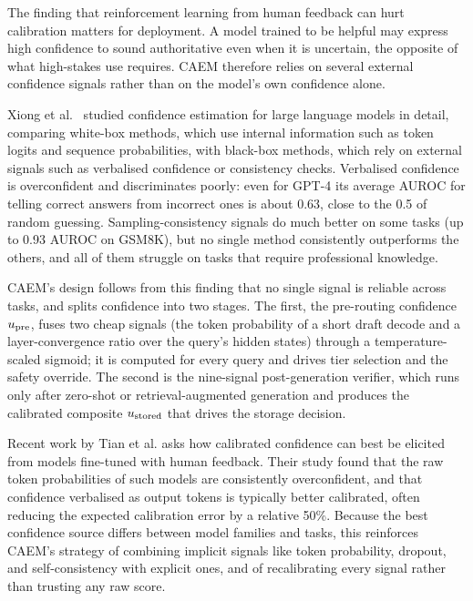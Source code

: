 The finding that reinforcement learning from human feedback can hurt calibration matters for deployment. A model trained to be helpful may express high confidence to sound authoritative even when it is uncertain, the opposite of what high-stakes use requires. CAEM therefore relies on several external confidence signals rather than on the model's own confidence alone.

Xiong et al.\ \cite{xiong2023can} studied confidence estimation for large language models in detail, comparing white-box methods, which use internal information such as token logits and sequence probabilities, with black-box methods, which rely on external signals such as verbalised confidence or consistency checks. Verbalised confidence is overconfident and discriminates poorly: even for GPT-4 its average AUROC for telling correct answers from incorrect ones is about 0.63, close to the 0.5 of random guessing. Sampling-consistency signals do much better on some tasks (up to 0.93 AUROC on GSM8K), but no single method consistently outperforms the others, and all of them struggle on tasks that require professional knowledge.

CAEM's design follows from this finding that no single signal is reliable across tasks, and splits confidence into two stages. The first, the pre-routing confidence $u_{\text{pre}}$, fuses two cheap signals (the token probability of a short draft decode and a layer-convergence ratio over the query's hidden states) through a temperature-scaled sigmoid; it is computed for every query and drives tier selection and the safety override. The second is the nine-signal post-generation verifier, which runs only after zero-shot or retrieval-augmented generation and produces the calibrated composite $u_{\text{stored}}$ that drives the storage decision.

Recent work by Tian et al. \cite{tian2023just} asks how calibrated confidence can best be elicited from models fine-tuned with human feedback. Their study found that the raw token probabilities of such models are consistently overconfident, and that confidence verbalised as output tokens is typically better calibrated, often reducing the expected calibration error by a relative 50\%. Because the best confidence source differs between model families and tasks, this reinforces CAEM's strategy of combining implicit signals like token probability, dropout, and self-consistency with explicit ones, and of recalibrating every signal rather than trusting any raw score.

